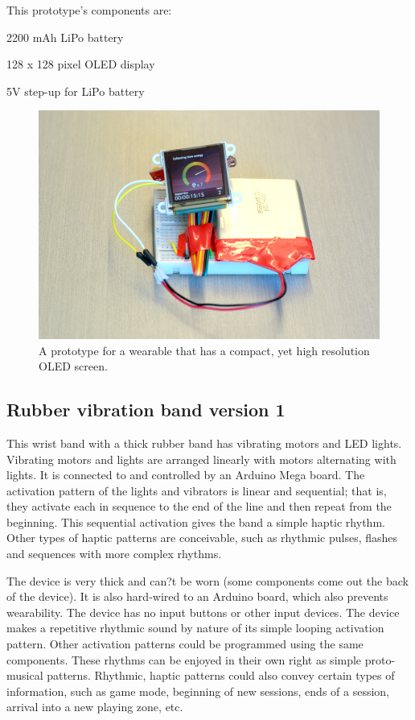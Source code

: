 \documentclass{chi-ext}
\begin{document}
This prototype's components are:
\begin{inparaenum}
\item 2200 mAh LiPo battery
\item 128 x 128 pixel OLED display
\item 5V step-up for LiPo battery
\end{inparaenum}

\begin{figure}
  \begin{center}
  \includegraphics[width=\columnwidth]{images/P1130382.jpg}
  \caption{A prototype for a wearable that has a compact, yet high resolution OLED screen.}
  \label{fig:oledscreen}
  \end{center}  
\end{figure}

\subsection{Rubber vibration band version 1}
This wrist band with a thick rubber band has vibrating motors and LED lights. Vibrating motors and lights are arranged linearly with motors alternating with lights. It is connected to and controlled by an Arduino Mega board. The activation pattern of the lights and vibrators is linear and sequential; that is, they activate each in sequence to the end of the line and then repeat from the beginning. This sequential activation gives the band a simple haptic rhythm. Other types of haptic patterns are conceivable, such as rhythmic pulses, flashes and sequences with more complex rhythms. 

The device is very thick and can?t be worn (some components come out the back of the device). It is also hard-wired to an Arduino board, which also prevents wearability. The device has no input buttons or other input devices. The device makes a repetitive rhythmic sound by nature of its simple looping activation pattern. Other activation patterns could be programmed using the same components. These rhythms can be enjoyed in their own right as simple proto-musical patterns. Rhythmic, haptic patterns could also convey certain types of information, such as game mode, beginning of new sessions, ends of a session, arrival into a new playing zone, etc. 
\end{document}
